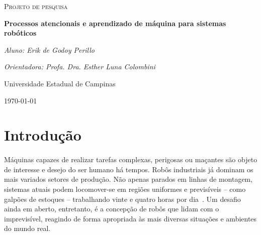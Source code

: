 \documentclass[11pt]{article}
\begin{document}
\begin{titlepage}
	\centering
	{\scshape\Large Projeto de pesquisa\par}
	\vspace{1.5cm}
	{\huge\bfseries Processos atencionais e aprendizado de máquina 
		para sistemas robóticos\par}
	\vspace{1cm}
	{\itshape Aluno: Erik de Godoy Perillo\par}
	{\itshape Orientadora: Profa. Dra. Esther Luna Colombini\par}
	\vspace{0.5cm}
	\begin{abstract}
		Entender o ambiente ao seu redor é uma tarefa fundamental para 
		o desafio de se obter máquinas autônomas que interagem com o 
		mundo de forma semelhante à nossa.
		No entanto, a alta dimensionalidade dos dados captados por sensores usados para 
		este fim é em geral problemática, muitas vezes havendo
		redundância e irrelevância de informação. Nos seres humanos este filtro sensorial é realizado pela Antenção.
		Neste contexto, este projeto propõe a aplicação de técnicas de aprendizado de máquina sobre informações sensoriais previamente processadas por processos atencionais em uma tarefa de navegação autônoma.  
		Adicionalmente, planeja-se implementar uma estrutura que permita o uso das
		técnicas propostas para projetos robóticos em geral que utilizem GPUs embarcadas.
	\end{abstract}
	\vfill
	Universidade Estadual de Campinas 
	\vfill
	{\large \today\par}
\end{titlepage}

\newpage

\section{Introdução}
\paragraph{}
Máquinas capazes de realizar tarefas complexas, perigosas ou maçantes são
objeto de interesse e desejo do ser humano há tempos. 
Robôs industriais já dominam os mais variados setores de produção. 
Não apenas parados em linhas de montagem, sistemas atuais podem locomover-se
em regiões uniformes e previsíveis -- como galpões de estoques -- trabalhando
vinte e quatro horas por dia~\cite{warehouse}.
Um desafio ainda em aberto, entretanto, é a concepção de robôs que lidam com 
o imprevisível, reagindo de forma apropriada às mais diversas situações 
e ambientes do mundo real. 
\end{document}
